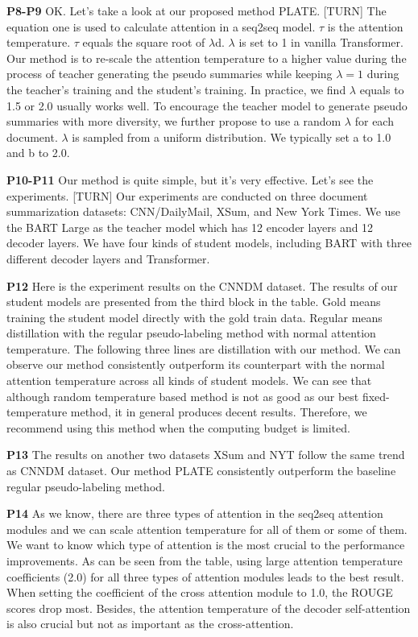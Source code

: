 \documentclass[a4paper, 12pt]{article}
\begin{document}
\textbf{P8-P9}
OK. Let's take a look at our proposed method PLATE.
[TURN]
The equation one is used to calculate attention in a seq2seq model. $\tau$ is the attention temperature. $\tau$ equals the square root of $\lambda$d. $\lambda$ is set to 1 in vanilla Transformer.
Our method is to re-scale the attention temperature to a higher value during the process of teacher generating the pseudo summaries while keeping $\lambda = 1$ during the teacher's training and the student's training.
In practice, we find $\lambda$ equals to 1.5 or 2.0 usually works well. 
To encourage the teacher model to generate pseudo summaries with more diversity, we further propose to use a random $\lambda$ for each document. $\lambda$ is sampled from a uniform distribution. We typically set a to 1.0 and b to 2.0.

\textbf{P10-P11}
Our method is quite simple, but it's very effective. Let's see the experiments. 
[TURN]
Our experiments are conducted on three document summarization datasets: CNN/DailyMail, XSum, and New York Times.
We use the BART Large as the teacher model which has 12 encoder layers and 12 decoder layers. We have four kinds of student models, including BART with three different decoder layers and Transformer.

\textbf{P12}
Here is the experiment results on the CNNDM dataset. The results of our student models are presented from the third block in the table.
Gold means training the student model directly with the gold train data. Regular means distillation with the regular pseudo-labeling method with normal attention temperature. The following three lines are distillation with our method. We can observe our method consistently outperform its counterpart with the normal attention temperature across all kinds of student models. 
We can see that although random temperature based method is not as good as our best fixed-temperature method, it in general produces decent results. Therefore, we recommend using this method when the computing budget is limited.

\textbf{P13}
The results on another two datasets XSum and NYT follow the same trend as CNNDM dataset. Our method PLATE consistently outperform the baseline regular pseudo-labeling method. 

\textbf{P14}
As we know, there are three types of attention in the seq2seq attention modules and we can scale attention temperature for all of them or some of them. We want to know which type of attention is the most crucial to the performance improvements.
As can be seen from the table, using large attention temperature coefficients (2.0) for all three types of attention modules
leads to the best result. When setting the coefficient of the cross attention module to 1.0, the ROUGE scores drop most.
Besides, the attention temperature of the decoder self-attention is also crucial but not as important as the cross-attention.
\end{document}
